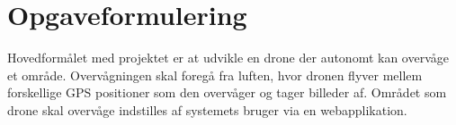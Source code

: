 \chapter{Opgaveformulering}
\label{chap:opgaveformulering}

Hovedformålet med projektet er at udvikle en drone der autonomt kan overvåge et område. Overvågningen skal foregå fra luften, hvor dronen flyver mellem forskellige GPS positioner som den overvåger og tager billeder af. Området som drone skal overvåge indstilles af systemets bruger via en webapplikation.

